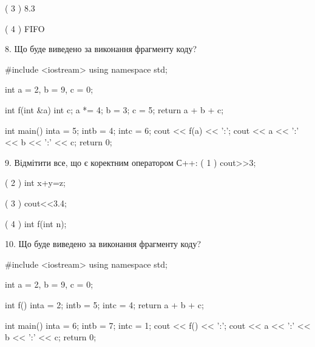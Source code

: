 \documentclass[11pt, ukrainian]{article}
\begin{document}
\begin{large}
( 3 ) 8.3

( 4 ) FIFO


8. Що буде виведено за виконання фрагменту коду?

#include <iostream>
using namespace std;

int a = 2, b = 9, c = 0;

int f(int &a){
int c;    a *= 4;
    b = 3;
    c = 5;
    return a + b + c;
}

int main(){
    inta = 5;
    intb = 4;
    intc = 6;
    cout << f(a) << ':';
    cout << a << ':' << b << ':' << c;
    return 0; 
}


9. Відмітити все, що є коректним оператором С++:
( 1 ) cout>>3;

( 2 ) int x+y=z;

( 3 ) cout<<3.4;

( 4 ) int f(int n);


10. Що буде виведено за виконання фрагменту коду?

#include <iostream>
using namespace std;

int a = 2, b = 9, c = 0;

int f(){
    inta = 2;
    intb = 5;
    intc = 4;
    return a + b + c;
}

int main(){
    inta = 6;
    intb = 7;
    intc = 1;
    cout << f() << ':';
    cout << a << ':' << b << ':' << c;
    return 0;
}

\end{large}
\vspace{20mm}
\end{document}
